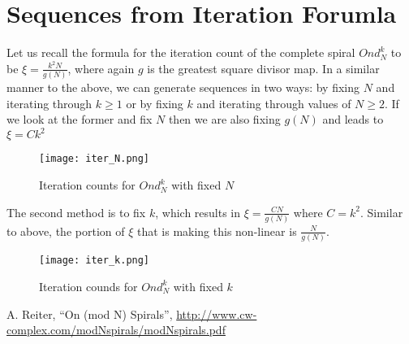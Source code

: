 \documentclass[11pt]{amsart}
\begin{document}

\section{Sequences from Iteration Forumla}
Let us recall the formula for the iteration count of the complete spiral $Ond^k_N$ to be $\xi = \frac{k^2N}{g(N)}$, where again $g$ is the greatest square divisor map. In a similar manner to the above, we can generate sequences in two ways: by fixing $N$ and iterating through $k \ge 1$ or by fixing $k$ and iterating through values of $N \ge 2$. If we look at the former and fix $N$ then we are also fixing $g(N)$ and leads to $\xi = Ck^2$

\begin{figure}[H]
\centering
\texttt{[image: iter\_N.png]}
\caption{Iteration counts for $Ond^k_N$ with fixed $N$}
\label{fig:iter_N}
\end{figure}

The second method is to fix $k$, which results in $\xi = \frac{CN}{g(N)}$ where $C = k^2$. Similar to above, the portion of $\xi$ that is making this non-linear is $\frac{N}{g(N)}$.

\begin{figure}[H]
\centering
\texttt{[image: iter\_k.png]}
\caption{Iteration counds for $Ond^k_N$ with fixed $k$}
\label{fig:iter_k}
\end{figure}

\begin{thebibliography}{1}
 A. Reiter, ``On (mod N) Spirals'', \url{http://www.cw-complex.com/modNspirals/modNspirals.pdf}
\end{thebibliography}
\end{document}
